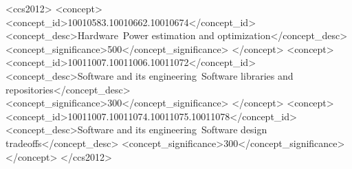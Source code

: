 \documentclass[sigconf]{acmart}
\begin{document}
%
%
\begin{CCSXML}
	<ccs2012>
	<concept>
	<concept_id>10010583.10010662.10010674</concept_id>
	<concept_desc>Hardware~Power estimation and optimization</concept_desc>
	<concept_significance>500</concept_significance>
	</concept>
	<concept>
	<concept_id>10011007.10011006.10011072</concept_id>
	<concept_desc>Software and its engineering~Software libraries and repositories</concept_desc>
	<concept_significance>300</concept_significance>
	</concept>
	<concept>
	<concept_id>10011007.10011074.10011075.10011078</concept_id>
	<concept_desc>Software and its engineering~Software design tradeoffs</concept_desc>
	<concept_significance>300</concept_significance>
	</concept>
	</ccs2012>
\end{CCSXML}





\maketitle




 
\end{document}
